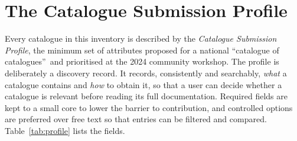\documentclass[10pt,a4paper]{article}
\begin{document}
\section{The Catalogue Submission Profile}\label{sec:schema}
Every catalogue in this inventory is described by the \emph{Catalogue Submission Profile}, the minimum set of attributes proposed for a national \textquotedblleft catalogue of catalogues\textquotedblright\ and prioritised at the 2024 community workshop. The profile is deliberately a discovery record. It records, consistently and searchably, \emph{what} a catalogue contains and \emph{how} to obtain it, so that a user can decide whether a catalogue is relevant before reading its full documentation. Required fields are kept to a small core to lower the barrier to contribution, and controlled options are preferred over free text so that entries can be filtered and compared. Table~\ref{tab:profile} lists the fields.
\end{document}
